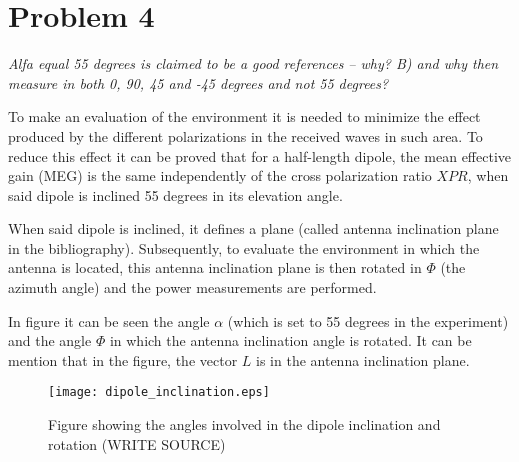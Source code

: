 \section{Problem 4}
\textit{Alfa equal 55 degrees is claimed to be a good references – why? B) and why then measure in both 0, 90, 45 and -45 degrees and not 55 degrees?}

To make an evaluation of the environment it is needed to minimize the effect produced by the different polarizations in the received waves in such area. To reduce this effect it can be proved that for a half-length dipole, the mean effective gain (MEG) is the same independently of the cross polarization ratio $XPR$, when said dipole is inclined 55 degrees in its elevation angle.

When said dipole is inclined, it defines a plane (called antenna inclination plane in the bibliography). Subsequently, to evaluate the environment in which the antenna is located, this antenna inclination plane is then rotated in $\Phi$ (the azimuth angle) and the power measurements are performed.

In figure  it can be seen the angle $\alpha$ (which is set to 55 degrees in the experiment) and the angle $\Phi$ in which the antenna inclination angle is rotated. It can be mention that in the figure, the vector $L$ is in the antenna inclination plane.


\begin{figure}[!h]
  \centering
  \texttt{[image: dipole\_inclination.eps]}
  \caption{Figure showing the angles involved in the dipole inclination and rotation (WRITE SOURCE)}
  \label{fig:dipole_inclination}
\end{figure}
